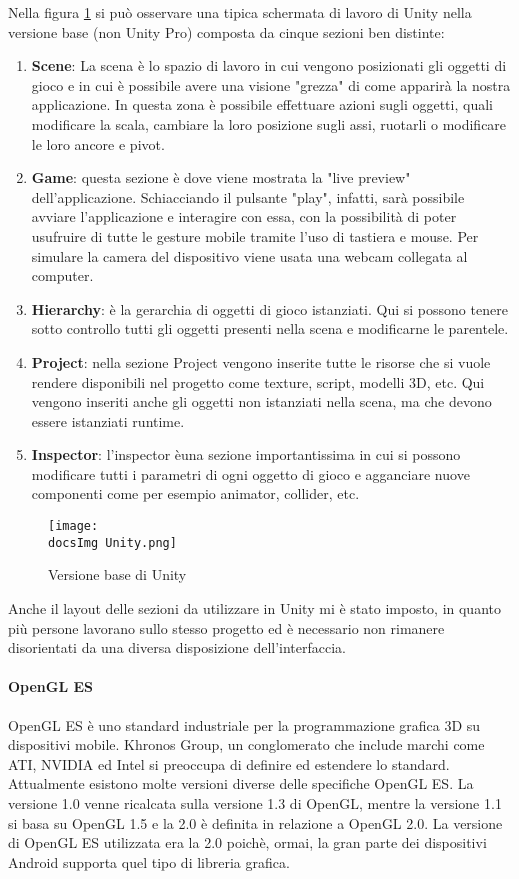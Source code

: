Nella figura \ref{fig:Versione base di Unity} si pu\`o osservare una tipica schermata di lavoro di Unity nella versione base (non Unity Pro) composta da cinque sezioni ben distinte:
\begin{enumerate}
	\item \textbf{Scene}: La scena \`e lo spazio di lavoro in cui vengono posizionati gli oggetti di gioco e in cui \`e possibile avere una visione "grezza" di come apparir\`a la nostra applicazione. In questa zona \`e possibile effettuare azioni sugli oggetti, quali modificare la scala, cambiare la loro posizione sugli assi, ruotarli o modificare le loro ancore e pivot.
	\item \textbf{Game}: questa sezione \`e dove viene mostrata la "live preview" dell'applicazione. Schiacciando il pulsante "play", infatti, sar\`a possibile avviare l'applicazione e interagire con essa, con la possibilit\`a di poter usufruire di tutte le gesture mobile tramite l'uso di tastiera e mouse. Per simulare la camera del dispositivo viene usata una webcam collegata al computer.
	\item \textbf{Hierarchy}: \`e la gerarchia di oggetti di gioco istanziati. Qui si possono tenere sotto controllo tutti gli oggetti presenti nella scena e modificarne le parentele.
	\item \textbf{Project}: nella sezione Project vengono inserite tutte le risorse che si vuole rendere disponibili nel progetto come texture, script, modelli 3D, etc. Qui vengono inseriti anche gli oggetti non istanziati nella scena, ma che devono essere istanziati runtime.
	\item \textbf{Inspector}: l'inspector \`euna sezione importantissima in cui si possono modificare tutti i parametri di ogni oggetto di gioco e agganciare nuove componenti come per esempio animator, collider, etc.
\end{enumerate}

\begin{figure}[H]
	\centering
	\texttt{[image: \\docsImg Unity.png]}
	\caption{Versione base di Unity}
	\label{fig:Versione base di Unity}
\end{figure}

Anche il layout delle sezioni da utilizzare in Unity mi \`e stato imposto, in quanto pi\`u persone lavorano sullo stesso progetto ed \`e necessario non rimanere disorientati da una diversa disposizione dell'interfaccia.

\paragraph{OpenGL ES}
OpenGL ES è uno standard industriale per la programmazione grafica 3D su dispositivi mobile. Khronos Group, un conglomerato che include marchi come ATI, NVIDIA ed Intel si preoccupa di definire ed estendere lo standard.
Attualmente esistono molte versioni diverse delle specifiche OpenGL ES. La versione 1.0 venne ricalcata sulla versione 1.3 di OpenGL, mentre la versione 1.1 si basa su OpenGL 1.5 e la 2.0 è definita in relazione a OpenGL 2.0. La versione di OpenGL ES utilizzata era la 2.0 poich\`e, ormai, la gran parte dei dispositivi Android supporta quel tipo di libreria grafica.

